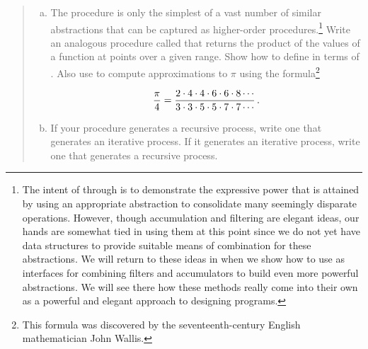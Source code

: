 \begin{quote}
 \begin{enumerate}[a.]

\item
The  procedure is only the simplest of a vast number of similar
abstractions that can be captured as higher-order procedures.\footnote{The
intent of  through  is to demonstrate the
expressive power that is attained by using an appropriate abstraction to
consolidate many seemingly disparate operations.  However, though accumulation
and filtering are elegant ideas, our hands are somewhat tied in using them at
this point since we do not yet have data structures to provide suitable means
of combination for these abstractions.  We will return to these ideas in
 when we show how to use  as interfaces
for combining filters and accumulators to build even more powerful
abstractions.  We will see there how these methods really come into their own
as a powerful and elegant approach to designing programs.}  Write an analogous
procedure called  that returns the product of the values of a
function at points over a given range.  Show how to define  in
terms of .  Also use  to compute approximations to
\( \pi \) using the formula\footnote{This formula was discovered by the
seventeenth-century English mathematician John Wallis.}
\begin{comment}

\begin{example}
pi   2 * 4 * 4 * 6 * 6 * 8 ...
-- = -------------------------
 4   3 * 3 * 5 * 5 * 7 * 7 ...
\end{example}

\end{comment}

$$ {\pi\over 4} = {2\cdot 4\cdot 4\cdot 6\cdot 6\cdot 8\cdots\over
		   3\cdot 3\cdot 5\cdot 5\cdot 7\cdot 7\cdots}\,. $$

\item
If your  procedure generates a recursive process, write one that
generates an iterative process.  If it generates an iterative process, write
one that generates a recursive process.

\end{enumerate}
\end{quote}

